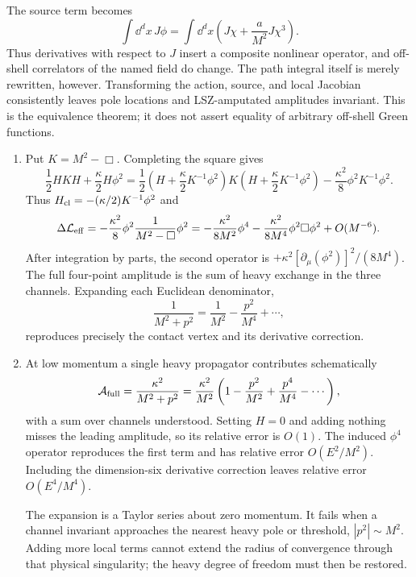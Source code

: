 \begin{enumerate}
The source term becomes
\[
 \int \dd^dx\,J\phi
 =\int \dd^dx\left(J\chi+\frac{a}{M^2}J\chi^3\right).
\]
Thus derivatives with respect to \(J\) insert a composite nonlinear
operator, and off-shell correlators of the named field do change.  The
path integral itself is merely rewritten, however.  Transforming the
action, source, and local Jacobian consistently leaves pole locations and
LSZ-amputated amplitudes invariant.  This is the equivalence theorem; it
does not assert equality of arbitrary off-shell Green functions.

\begin{enumerate}
\item
Put \(K=M^2-\Box\).  Completing the square gives
\[
 \frac12H K H+\frac{\kappa}{2}H\phi^2
 =\frac12\left(H+\frac{\kappa}{2}K^{-1}\phi^2\right)
 K\left(H+\frac{\kappa}{2}K^{-1}\phi^2\right)
 -\frac{\kappa^2}{8}\phi^2K^{-1}\phi^2.
\]
Thus \(H_{\rm cl}=-(\kappa/2)K^{-1}\phi^2\) and
\[
 \Delta\mathcal L_{\rm eff}
 =-\frac{\kappa^2}{8}\phi^2\frac1{M^2-\Box}\phi^2
 =-\frac{\kappa^2}{8M^2}\phi^4
 -\frac{\kappa^2}{8M^4}\phi^2\Box\phi^2+O(M^{-6}).
\]
After integration by parts, the second operator is
\(+\kappa^2[\partial_\mu(\phi^2)]^2/(8M^4)\).
The full four-point amplitude is the sum of heavy exchange in the three
channels.  Expanding each Euclidean denominator,
\[
 \frac1{M^2+p^2}=\frac1{M^2}-\frac{p^2}{M^4}+\cdots,
\]
reproduces precisely the contact vertex and its derivative correction.
\item
At low momentum a single heavy propagator contributes schematically
\[
 \mathcal A_{\rm full}
 =\frac{\kappa^2}{M^2+p^2}
 =\frac{\kappa^2}{M^2}
 \left(1-\frac{p^2}{M^2}+\frac{p^4}{M^4}-\cdots\right),
\]
with a sum over channels understood.  Setting \(H=0\) and adding nothing
misses the leading amplitude, so its relative error is \(O(1)\).
The induced \(\phi^4\) operator reproduces the first term and has relative
error \(O(E^2/M^2)\).  Including the dimension-six derivative correction
leaves relative error \(O(E^4/M^4)\).

The expansion is a Taylor series about zero momentum.  It fails when a
channel invariant approaches the nearest heavy pole or threshold,
\(|p^2|\sim M^2\).  Adding more local terms cannot extend the radius of
convergence through that physical singularity; the heavy degree of freedom
must then be restored.
\end{enumerate}


\end{enumerate}
